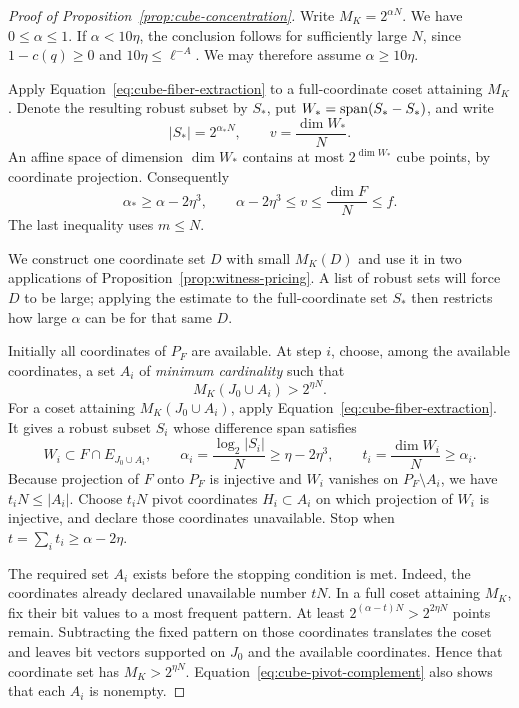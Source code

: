 \begin{proof}[Proof of Proposition~\ref{prop:cube-concentration}]
Write \(M_K=2^{\alpha N}\). We have \(0\le\alpha\le1\). If
\(\alpha<10\eta\), the conclusion follows for sufficiently large
\(N\), since \(1-c(q)\ge0\) and \(10\eta\le\ell^{-A}\). We may
therefore assume \(\alpha\ge10\eta\).

Apply Equation~\eqref{eq:cube-fiber-extraction} to a full-coordinate
coset attaining \(M_K\). Denote the resulting robust subset by \(S_*\),
put \(W_*=\operatorname{span}(S_*-S_*)\), and write
\[
 |S_*|=2^{\alpha_*N},\qquad v=\frac{\dim W_*}{N}.
\]
An affine space of dimension \(\dim W_*\) contains at most
\(2^{\dim W_*}\) cube points, by coordinate projection. Consequently
\begin{equation}\label{eq:cube-full-witness}
 \alpha_*\ge\alpha-2\eta^3,\qquad
 \alpha-2\eta^3\le v\le\frac{\dim F}{N}\le f.
\end{equation}
The last inequality uses \(m\le N\).

We construct one coordinate set \(D\) with small \(M_K(D)\) and use it
in two applications of Proposition~\ref{prop:witness-pricing}. A list of
robust sets will force \(D\) to be large; applying the estimate to the
full-coordinate set \(S_*\) then restricts how large \(\alpha\) can be
for that same \(D\).

Initially all coordinates of \(P_F\) are available. At step \(i\),
choose, among the available coordinates, a set \(A_i\) of
\emph{minimum cardinality} such that
\[
 M_K(J_0\cup A_i)>2^{\eta N}.
\]
For a coset attaining \(M_K(J_0\cup A_i)\), apply
Equation~\eqref{eq:cube-fiber-extraction}. It gives a robust subset
\(S_i\) whose difference span satisfies
\[
 W_i\subset F\cap E_{J_0\cup A_i},\qquad
 \alpha_i=\frac{\log_2|S_i|}{N}\ge\eta-2\eta^3,\qquad
 t_i=\frac{\dim W_i}{N}\ge\alpha_i.
\]
Because projection of \(F\) onto \(P_F\) is injective and \(W_i\)
vanishes on \(P_F\setminus A_i\), we have \(t_iN\le|A_i|\). Choose
\(t_iN\) pivot coordinates \(H_i\subset A_i\) on which projection of
\(W_i\) is injective, and declare those coordinates unavailable.
Stop when \(t=\sum_i t_i\ge\alpha-2\eta\).

The required set \(A_i\) exists before the stopping condition is met.
Indeed, the coordinates already declared unavailable number \(tN\).
In a full coset attaining \(M_K\), fix their bit values to a most
frequent pattern. At least \(2^{(\alpha-t)N}>2^{2\eta N}\) points
remain. Subtracting the fixed pattern on those coordinates translates
the coset and leaves bit vectors supported on \(J_0\) and the available
coordinates. Hence that coordinate set has \(M_K>2^{\eta N}\).
Equation~\eqref{eq:cube-pivot-complement} also shows that each \(A_i\)
is nonempty.


\end{proof}
